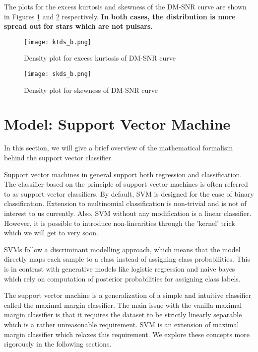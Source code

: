 \documentclass[conference]{IEEEtran}
\begin{document}
The plots for the excess kurtosis and skewness of the DM-SNR curve are shown in Figures \ref{ktds_b} and \ref{skds_b} respectively. \textbf{In both cases, the distribution is more spread out for stars which are not pulsars.}

\begin{figure}[tbh]
\centering
\texttt{[image: ktds\_b.png]}
\caption{Density plot for excess kurtosis of DM-SNR curve}
\label{ktds_b}
\end{figure}

\begin{figure}[tbh]
\centering
\texttt{[image: skds\_b.png]}
\caption{Density plot for skewness of DM-SNR curve}
\label{skds_b}
\end{figure}


\section{Model: Support Vector Machine}

In this section, we will give a brief overview of the mathematical formalism behind the support vector classifier. 

Support vector machines in general support both regression and classification. The classifier based on the principle of support vector machines is often referred to as support vector classifiers. By default, SVM is designed for the case of binary classification. Extension to multinomial classification is non-trivial and is not of interest to us currently. Also, SVM without any modification is a linear classifier. However, it is possible to introduce non-linearities through the 'kernel' trick which we will get to very soon.

SVMs follow a discriminant modelling approach, which means that the model directly maps each sample to a class instead of assigning class probabilities. This is in contrast with generative models like logistic regression and naive bayes which rely on computation of posterior probabilities for assigning class labels.

The support vector machine is a generalization of a simple and intuitive classifier called the maximal margin classifier. The main issue with the vanilla maximal margin classifier is that it requires the dataset to be strictly linearly separable which is a rather unreasonable requirement. SVM is an extension of maximal margin classifier which relaxes this requirement. We explore these concepts more rigorously in the following sections.
\end{document}
